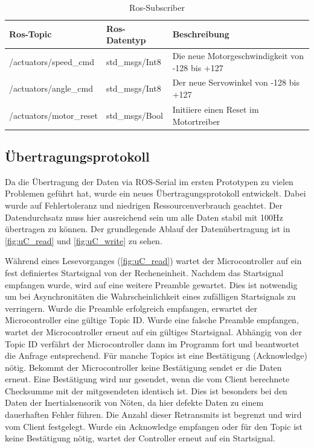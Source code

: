 \begin{table}[H]
  \centering
  \begin{tabularx}{\textwidth}{|X|l|X|}
    \hline
     Ros-Topic 			& Ros-Datentyp		 	& Beschreibung 	\\ \hline \hline
    /actuators/speed\_cmd		& std\_msgs/Int8		& Die neue Motorgeschwindigkeit von -128 bis +127		\\ \hline
    /actuators/angle\_cmd		& std\_msgs/Int8		& Der neue Servowinkel von -128 bis +127			\\ \hline
    /actuators/motor\_reset		& std\_msgs/Bool		& Initiiere einen Reset im Motortreiber				\\ \hline
  \end{tabularx}
  \caption{Ros-Subscriber}%
  \label{tab:ros-sub}
\end{table}



\subsection{Übertragungsprotokoll}
Da die Übertragung der Daten via ROS-Serial im ersten Prototypen zu vielen Problemen geführt hat, wurde ein neues Übertragungsprotokoll entwickelt.
Dabei wurde auf Fehlertoleranz und niedrigen Ressourcenverbrauch geachtet. Der Datendurchsatz muss hier ausreichend sein um alle Daten stabil mit 100Hz
übertragen zu können.
Der grundlegende Ablauf der Datenübertragung ist in \cref{fig:uC_read} und \ref{fig:uC_write} zu sehen.


Während eines Lesevorganges (\cref{fig:uC_read}) wartet der Microcontroller auf ein fest definiertes Startsignal von der Recheneinheit. Nachdem das Startsignal empfangen wurde, wird auf eine weitere Preamble gewartet.
Dies ist notwendig um bei Asynchronitäten die Wahrscheinlichkeit eines zufälligen Startsignals zu verringern. Wurde die Preamble erfolgreich empfangen, erwartet der Microcontroller eine gültige Topic ID.
Wurde eine falsche Preamble empfangen, wartet der Microcontroller erneut auf ein gültiges Startsignal. Abhängig von der Topic ID verfährt der Microcontroller dann im Programm fort und beantwortet
die Anfrage entsprechend. Für manche Topics ist eine Bestätigung (Acknowledge) nötig. Bekommt der Microcontroller keine Bestätigung sendet er die Daten erneut. Eine Bestätigung wird nur gesendet,
wenn die vom Client berechnete Checksumme mit der mitgesendeten identisch ist. Dies ist besonders bei den Daten der Inertialsensorik von Nöten, da hier defekte Daten zu einem dauerhaften Fehler führen. 
Die Anzahl dieser Retransmits ist begrenzt und wird vom Client festgelegt. Wurde ein Acknowledge empfangen oder für den Topic ist keine Bestätigung
nötig, wartet der Controller erneut auf ein Startsignal.

